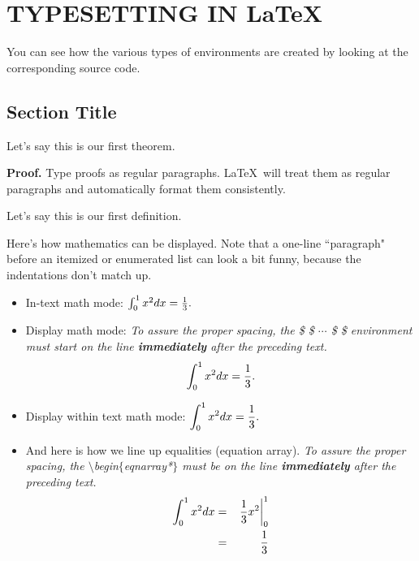 \chapter{TYPESETTING IN \LaTeX }\label{chap2:latex}


You can see how the various types of environments
are created by looking at the corresponding source code.


\section{Section Title}

\begin{theorem}
\label{th1}

Let's say this is our first theorem.

\end{theorem}


{\bf Proof.}
Type proofs as regular paragraphs. \LaTeX \ will treat them as
regular paragraphs and automatically format them consistently.


\begin{definition}
\label{def1}

Let's say this is our first definition.

\end{definition}


Here's how mathematics can be displayed.
Note that a one-line ``paragraph" before an
itemized or enumerated list can look a bit funny, because the
indentations don't match up.

\begin{itemize}
\item
In-text math mode: $\int _0 ^1 x^2 dx = {1\over 3} .$



\item
Display  math mode:
{\em
To assure the proper spacing, the \$ \$ $\cdots $ \$ \$
environment
must start on the line {\bf immediately} after the preceding text.}
$$\int _0 ^1 x^2 dx = {1\over 3} .$$

\item
Display within text math mode: $\displaystyle{ \int _0 ^1 x^2 dx = {1\over 3} .} $

\item
And here is how we line up equalities (equation array).
{\em To assure the proper spacing, the $\setminus $begin$\{ $eqnarray*$\} $
must be on the line {\bf immediately} after the preceding text.}
\begin{eqnarray*}
\int _0 ^1 x^2 dx
& = &
\left. {1\over 3} x^2 \right| _{0} ^1
\\
& = &
{1\over 3}
\end{eqnarray*}

\end{itemize}


